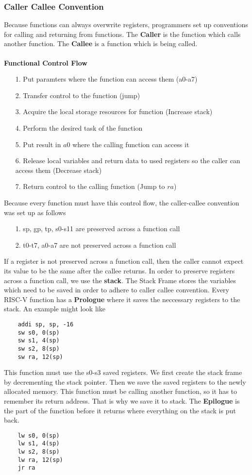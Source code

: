 \documentclass{article}
\begin{document}
\subsubsection{Caller Callee Convention}
Because functions can always overwrite registers, programmers set up conventions for calling and returning from functions.
The \textbf{Caller} is the function which calls another function. The \textbf{Callee} is a function which is being called.\\\\
\textbf{Functional Control Flow}
\begin{itemize}
    \item[1.] Put paramters where the function can access them (a0-a7)
    \item[2.] Transfer control to the function (jump)
    \item[3.] Acquire the local storage resources for function (Increase stack)
    \item[4.] Perform the desired task of the function
    \item[5.] Put result in $a0$ where the calling function can access it
    \item[6.] Release local variables and return data to used registers so the caller can access them (Decrease stack)
    \item[7.] Return control to the calling function (Jump to $ra$)    
\end{itemize}
Because every function must have this control flow, the caller-callee convention was set up as follows
\begin{itemize}
    \item[1.] sp, gp, tp, s0-s11 are preserved across a function call
    \item[2.] t0-t7, a0-a7 are not preserved across a function call
\end{itemize}
If a register is not preserved across a function call, then the caller cannot expect its value to be the same
after the callee returns. In order to preserve registers across a function call, we use the \textbf{stack}. The
Stack Frame stores the variables which need to be saved in order to adhere to caller callee convention. Every RISC-V
function has a \textbf{Prologue} where it saves the neccessary registers to the stack. An example might look like
\begin{lstlisting}
    addi sp, sp, -16
    sw s0, 0(sp)
    sw s1, 4(sp)
    sw s2, 8(sp)
    sw ra, 12(sp)
\end{lstlisting}
This function must use the s0-s3 saved registers. We first create the stack frame by decrementing the stack pointer.
Then we save the saved registers to the newly allocated memory. This function must be calling another function, so it
has to remember its return address. That is why we save it to stack. The \textbf{Epilogue} is the part of the function
before it returns where everything on the stack is put back.
\begin{lstlisting}
    lw s0, 0(sp)
    lw s1, 4(sp)
    lw s2, 8(sp)
    lw ra, 12(sp)
    jr ra
\end{lstlisting}
\end{document}
